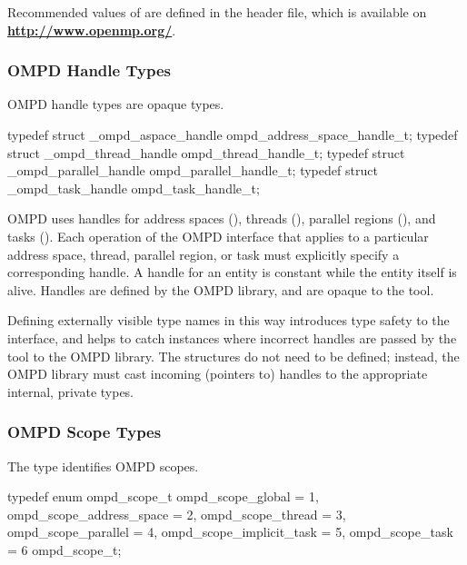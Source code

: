 Recommended values of  are defined in the 
 header file, which is available on 
\textbf{\url{http://www.openmp.org/}}.



\subsubsection{OMPD Handle Types}
\label{subsubsec:ompd_address_space_handle_t}
\label{subsubsec:ompd_thread_handle_t}
\label{subsubsec:ompd_parallel_handle_t}
\label{subsubsec:ompd_task_handle_t}

\summary
OMPD handle types are opaque types.

\format
\begin{ccppspecific}
\begin{ompSyntax}
typedef struct _ompd_aspace_handle ompd_address_space_handle_t;
typedef struct _ompd_thread_handle ompd_thread_handle_t;
typedef struct _ompd_parallel_handle ompd_parallel_handle_t;
typedef struct _ompd_task_handle ompd_task_handle_t;
\end{ompSyntax}
\end{ccppspecific}

\descr
OMPD uses handles for address spaces (),
threads (), parallel regions 
(), and tasks ().
Each operation of the OMPD interface that applies to a particular address 
space, thread, parallel region, or task must explicitly specify a corresponding 
handle. A handle for an entity is constant while the entity itself is alive. 
Handles are defined by the OMPD library, and are opaque to the tool.

Defining externally visible type names in this way introduces type safety to 
the interface, and helps to catch instances where incorrect handles are passed 
by the tool to the OMPD library. The structures do not need to be defined;
instead, the OMPD library must cast incoming (pointers to) handles to the 
appropriate internal, private types.



\subsubsection{OMPD Scope Types}
\label{subsubsec:ompd_scope_t}

\summary
The  type identifies OMPD scopes.

\format
\begin{ccppspecific}
\begin{ompSyntax}
typedef enum ompd_scope_t {
  ompd_scope_global = 1,
  ompd_scope_address_space = 2,
  ompd_scope_thread = 3,
  ompd_scope_parallel = 4,
  ompd_scope_implicit_task = 5,
  ompd_scope_task = 6
} ompd_scope_t;
\end{ompSyntax}
\end{ccppspecific}

